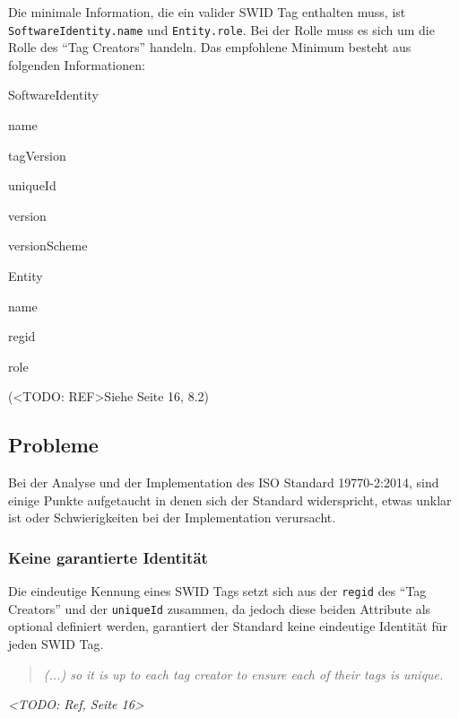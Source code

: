 \begin{itemize}
	\item Die minimale Information, die ein valider SWID Tag enthalten muss, ist
	\texttt{SoftwareIdentity.name} und \texttt{Entity.role}. Bei der Rolle muss es
	sich um die Rolle des \enquote{Tag Creators} handeln. Das empfohlene
	Minimum besteht aus folgenden Informationen:
		\item Entity
	\end{itemize*}	
	(<TODO: REF>Siehe Seite 16, 8.2)
	
\end{itemize}


\subsection{Probleme}
Bei der Analyse und der Implementation des ISO Standard 19770-2:2014, sind
einige Punkte aufgetaucht in denen sich der Standard widerspricht, etwas unklar
ist oder Schwierigkeiten bei der Implementation verursacht.

\subsubsection{Keine garantierte Identität}
Die eindeutige Kennung eines SWID Tags setzt sich aus der \texttt{regid} des
\enquote{Tag Creators} und der \texttt{uniqueId} zusammen, da jedoch diese
beiden Attribute als optional definiert werden, garantiert der Standard keine
eindeutige Identität für jeden SWID Tag.
\begin{quote}
\textit{(...) so it is up to each tag creator to ensure each of their tags is
unique.}
\end{quote}
\textit{<TODO: Ref, Seite 16>}\\

